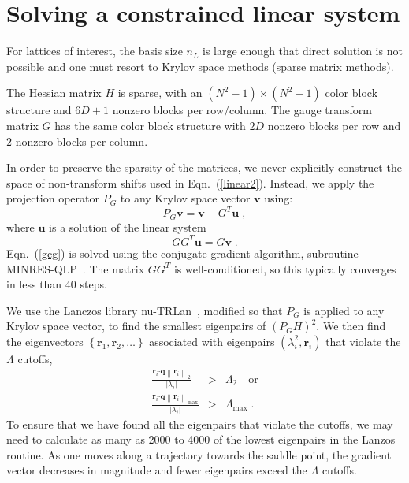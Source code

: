 \documentclass[preprint,aps,prd]{revtex4-2}
\newcommand{\be}{\begin{equation}}
\newcommand{\eq}{\end{equation}}
\begin{document}
\section{Solving a constrained linear system}
\label{krylov}

For lattices of interest, the basis size $n_L$ is large enough
that direct solution is not possible and one must resort to Krylov
space methods (sparse matrix methods).

The Hessian matrix $H$ is sparse, with an $(N^2-1)\times(N^2-1)$
color block structure and $6D+1$ nonzero blocks per row/column.
The gauge transform matrix $G$ has the same color block structure
with $2 D$ nonzero blocks per row and $2$ nonzero blocks per column.

In order to preserve the sparsity of the matrices, we never
explicitly construct the space of non-transform shifts used in
Eqn.~(\ref{linear2}).  Instead, we apply the projection
operator $P_G$ to any Krylov space vector $\mathbf{v}$ using:
\be
    P_G \mathbf{v} = \mathbf{v} - G^T \mathbf{u} \; ,
\eq
where $\mathbf{u}$ is a solution of the linear system
\be
  G G^T \mathbf{u} = G \mathbf{v} \; .\label{gcg}
\eq
Eqn.~(\ref{gcg}) is solved using the conjugate gradient
algorithm, subroutine MINRES-QLP~\cite{choi_algorithm_2014}.
The matrix $G G^T$ is well-conditioned, so this typically converges
in less than 40 steps.

We use the Lanczos library nu-TRLan~\cite{yamazaki_adaptive_2010},
modified so that $P_G$ is applied to any Krylov space vector, to
find the smallest eigenpairs of $\left(P_G H\right)^2$.  We then find
the eigenvectors $\left\{\mathbf{r}_1, \mathbf{r}_2, \ldots\right\}$
associated with eigenpairs $\left(\lambda_i^2, \mathbf{r}_i\right)$
that violate the $\Lambda$ cutoffs,
\begin{eqnarray}
   \frac{ \mathbf{r}_i \mathbf{\cdot} \mathbf{q}
   \left\lVert \mathbf{r}_i\right\rVert_2}{\left|\lambda_i\right| }
     &>& \Lambda_2  \quad\mbox{or} \\
   \frac{ \mathbf{r}_i\mathbf{\cdot} \mathbf{q}
   \left\lVert \mathbf{r}_i\right\rVert_\mathrm{max}}{\left|\lambda_i\right| }
     &>& \Lambda_\mathrm{max} \; .
\end{eqnarray}
To ensure that we have found all the eigenpairs that violate the cutoffs,
we may need to calculate as many as 2000 to 4000 of the lowest eigenpairs
in the Lanzos routine.  As one moves along a trajectory towards the
saddle point, the gradient vector decreases in magnitude and fewer eigenpairs
exceed the $\Lambda$ cutoffs.
\end{document}

